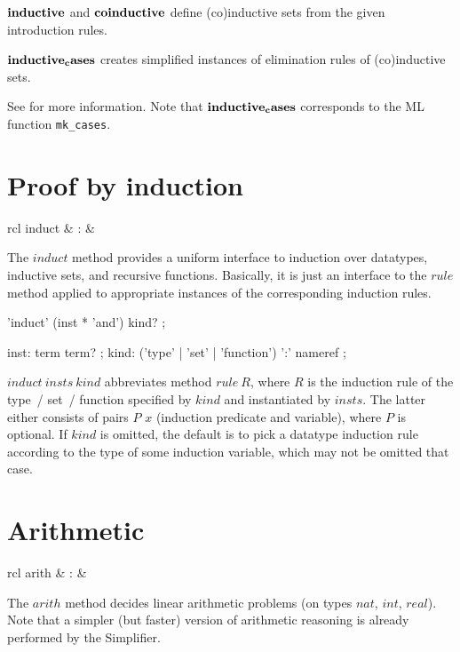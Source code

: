 \begin{descr}
\item [${\mathord{\mathbf{inductive}}}$ and ${\mathord{\mathbf{coinductive}}}$] define
  (co)inductive sets from the given introduction rules.
\item [${\mathord{\mathbf{inductive_cases}}}$] creates simplified instances of
  elimination rules of (co)inductive sets.
\end{descr}

See \cite{isabelle-HOL} for more information.  Note that
${\mathord{\mathbf{inductive_cases}}}$ corresponds to the ML function
\texttt{mk_cases}.


\section{Proof by induction}

\begin{matharray}{rcl}
  induct & : & \isarmeth \\
\end{matharray}

The $induct$ method provides a uniform interface to induction over datatypes,
inductive sets, and recursive functions.  Basically, it is just an interface
to the $rule$ method applied to appropriate instances of the corresponding
induction rules.

\begin{rail}
  'induct' (inst * 'and') kind?
  ;

  inst: term term?
  ;
  kind: ('type' | 'set' | 'function') ':' nameref
  ;
\end{rail}

\begin{descr}
\item [$induct~insts~kind$] abbreviates method $rule~R$, where $R$ is the
  induction rule of the type~/ set~/ function specified by $kind$ and
  instantiated by $insts$.  The latter either consists of pairs $P$ $x$
  (induction predicate and variable), where $P$ is optional.  If $kind$ is
  omitted, the default is to pick a datatype induction rule according to the
  type of some induction variable, which may not be omitted that case.
\end{descr}


\section{Arithmetic}

\begin{matharray}{rcl}
  arith & : & \isarmeth \\
\end{matharray}

The $arith$ method decides linear arithmetic problems (on types $nat$, $int$,
$real$).  Note that a simpler (but faster) version of arithmetic reasoning is
already performed by the Simplifier.


